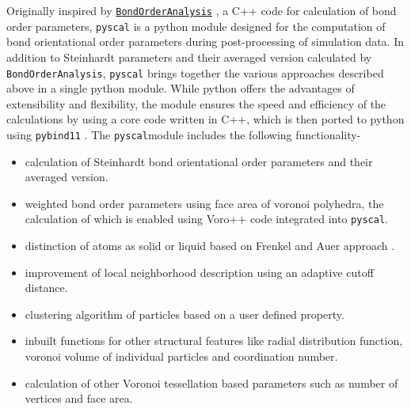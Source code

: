 \documentclass[]{article}
\providecommand{\tightlist}{%
  \setlength{\itemsep}{0pt}\setlength{\parskip}{0pt}}
\begin{document}
Originally inspired by
\href{https://homepage.univie.ac.at/wolfgang.lechner/bondorderparameter.html}{\texttt{BondOrderAnalysis}}
\citep{Lechner:2010}, a C++ code for calculation of bond order
parameters, \texttt{pyscal} is a python module designed for the
computation of bond orientational order parameters during
post-processing of simulation data. In addition to Steinhardt parameters
and their averaged version calculated by \texttt{BondOrderAnalysis},
\texttt{pyscal} brings together the various approaches described above in
a single python module. While python offers the advantages of
extensibility and flexibility, the module ensures the speed and
efficiency of the calculations by using a core code written in C++,
which is then ported to python using \texttt{pybind11}
\citep{Jakob:2016}. The \texttt{pyscal}module includes the following
functionality-

\begin{itemize}
\tightlist
\item
  calculation of Steinhardt bond orientational order parameters and
  their averaged version.
\item
  weighted bond order parameters using face area of voronoi polyhedra,
  the calculation of which is enabled using Voro++ code
  \citep{Rycroft:2009} integrated into \texttt{pyscal}.
\item
  distinction of atoms as solid or liquid based on Frenkel and Auer
  approach \citep{Auer:2005}.
\item
  improvement of local neighborhood description using an adaptive cutoff
  distance.
\item
  clustering algorithm of particles based on a user defined property.
\item
  inbuilt functions for other structural features like radial
  distribution function, voronoi volume of individual particles and
  coordination number.
\item
  calculation of other Voronoi tessellation based parameters such as
  number of vertices and face area.
\end{itemize}
\end{document}
